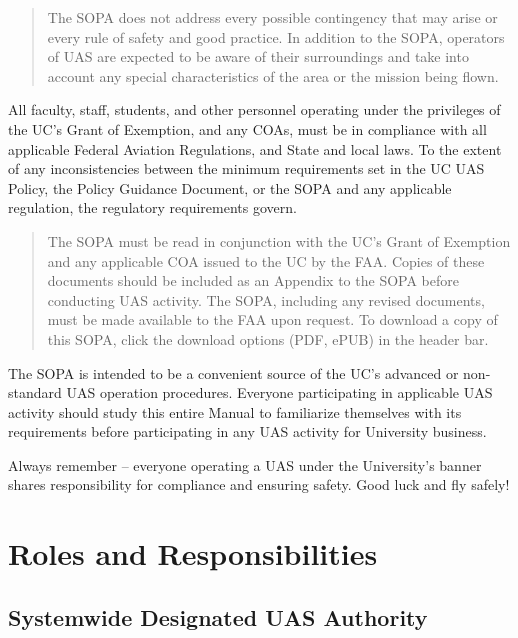 \documentclass[
]{book}
\begin{document}
\begin{quote}
The SOPA does not address every possible contingency that may arise or every rule of safety and good practice. In addition to the SOPA, operators of UAS are expected to be aware of their surroundings and take into account any special characteristics of the area or the mission being flown.
\end{quote}

All faculty, staff, students, and other personnel operating under the privileges of the UC's Grant of Exemption, and any COAs, must be in compliance with all applicable Federal Aviation Regulations, and State and local laws. To the extent of any inconsistencies between the minimum requirements set in the UC UAS Policy, the Policy Guidance Document, or the SOPA and any applicable regulation, the regulatory requirements govern.

\begin{quote}
The SOPA must be read in conjunction with the UC's Grant of Exemption and any applicable COA issued to the UC by the FAA. Copies of these documents should be included as an Appendix to the SOPA before conducting UAS activity. The SOPA, including any revised documents, must be made available to the FAA upon request. To download a copy of this SOPA, click the download options (PDF, ePUB) in the header bar.
\end{quote}

The SOPA is intended to be a convenient source of the UC's advanced or non-standard UAS operation procedures. Everyone participating in applicable UAS activity should study this entire Manual to familiarize themselves with its requirements before participating in any UAS activity for University business.

Always remember -- everyone operating a UAS under the University's banner shares responsibility for compliance and ensuring safety.
Good luck and fly safely!

\hypertarget{ch-roles-responsibilities}{%
\chapter{Roles and Responsibilities}\label{ch-roles-responsibilities}}

\hypertarget{systemwide-designated-uas-authority}{%
\section{Systemwide Designated UAS Authority}\label{systemwide-designated-uas-authority}}
\end{document}
